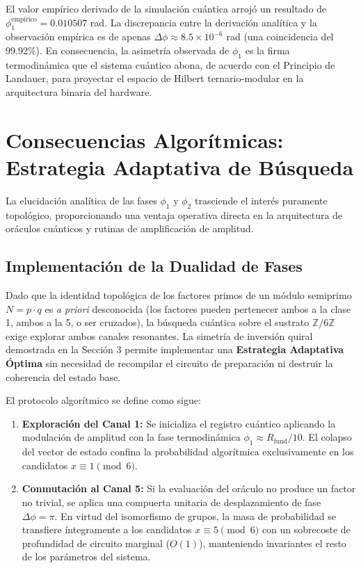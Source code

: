 \documentclass[12pt,a4paper]{article}
\theoremstyle{plain}
\theoremstyle{definition}
\theoremstyle{remark}
\begin{document}
El valor empírico derivado de la simulación cuántica arrojó un resultado de $\phi_1^{\text{empírico}} = 0.010507$ rad. La discrepancia entre la derivación analítica y la observación empírica es de apenas $\Delta\phi \approx 8.5 \times 10^{-6}$ rad (una coincidencia del $99.92\%$). En consecuencia, la asimetría observada de $\phi_1$ es la firma termodinámica que el sistema cuántico abona, de acuerdo con el Principio de Landauer, para proyectar el espacio de Hilbert ternario-modular en la arquitectura binaria del hardware.

\section{Consecuencias Algorítmicas: Estrategia Adaptativa de Búsqueda}

La elucidación analítica de las fases $\phi_1$ y $\phi_2$ trasciende el interés puramente topológico, proporcionando una ventaja operativa directa en la arquitectura de oráculos cuánticos y rutinas de amplificación de amplitud.

\subsection{Implementación de la Dualidad de Fases}

Dado que la identidad topológica de los factores primos de un módulo semiprimo $N = p \cdot q$ es \textit{a priori} desconocida (los factores pueden pertenecer ambos a la clase 1, ambos a la 5, o ser cruzados), la búsqueda cuántica sobre el sustrato $\mathbb{Z}/6\mathbb{Z}$ exige explorar ambos canales resonantes. La simetría de inversión quiral demostrada en la Sección 3 permite implementar una \textbf{Estrategia Adaptativa Óptima} sin necesidad de recompilar el circuito de preparación ni destruir la coherencia del estado base.

El protocolo algorítmico se define como sigue:
\begin{enumerate}
    \item \textbf{Exploración del Canal 1:} Se inicializa el registro cuántico aplicando la modulación de amplitud con la fase termodinámica $\phi_1 \approx R_{\text{fund}}/10$. El colapso del vector de estado confina la probabilidad algorítmica exclusivamente en los candidatos $x \equiv 1 \pmod 6$.
    \item \textbf{Conmutación al Canal 5:} Si la evaluación del oráculo no produce un factor no trivial, se aplica una compuerta unitaria de desplazamiento de fase $\Delta\phi = \pi$. En virtud del isomorfismo de grupos, la masa de probabilidad se transfiere íntegramente a los candidatos $x \equiv 5 \pmod 6$ con un sobrecoste de profundidad de circuito marginal ($O(1)$), manteniendo invariantes el resto de los parámetros del sistema.
\end{enumerate}
\end{document}
